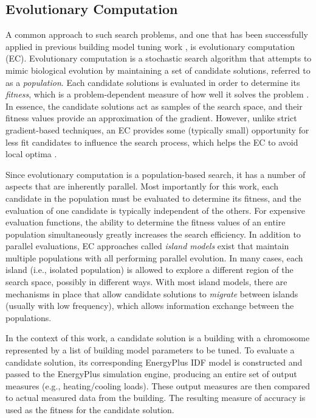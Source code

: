 \documentclass[preprint, review, 12pt]{elsarticle}
\begin{document}
\subsection{Evolutionary Computation}
A common approach to such search problems, and one that has been successfully applied in previous building model tuning work \cite{cit:garrett2013}, is evolutionary computation (EC). Evolutionary computation \cite{cit:dejong1993,cit:spears1993,cit:fogel1994,cit:fogel2000} is a stochastic search algorithm that attempts to mimic biological evolution by maintaining a set of candidate solutions, referred to as a \emph{population}. Each candidate solutions is evaluated in order to determine its \emph{fitness}, which is a problem-dependent measure of how well it solves the problem \cite{cit:dejong2006}. In essence, the candidate solutions act as samples of the search space, and their fitness values provide an approximation of the gradient. However, unlike strict gradient-based techniques, an EC provides some (typically small) opportunity for less fit candidates to influence the search process, which helps the EC to avoid local optima \cite{cit:michalewicz2004}. 

Since evolutionary computation is a population-based search, it has a number of aspects that are inherently parallel. Most importantly for this work, each candidate in the population must be evaluated to determine its fitness, and the evaluation of one candidate is typically independent of the others. For expensive evaluation functions, the ability to determine the fitness values of an entire population simultaneously greatly increases the search efficiency. In addition to parallel evaluations, EC approaches called \emph{island models} \cite{cit:eiben2007} exist that maintain multiple populations with all performing parallel evolution. In many cases, each island (i.e., isolated population) is allowed to explore a different region of the search space, possibly in different ways. With most island models, there are mechanisms in place that allow candidate solutions to \emph{migrate} between islands (usually with low frequency), which allows information exchange between the populations.

In the context of this work, a candidate solution is a building with a chromosome represented by a list of building model parameters to be tuned. To evaluate a candidate solution, its corresponding EnergyPlus IDF model is constructed and passed to the EnergyPlus simulation engine, producing an entire set of output measures (e.g., heating/cooling loads). These output measures are then compared to actual measured data from the building. The resulting measure of accuracy is used as the fitness for the candidate solution.
\end{document}
